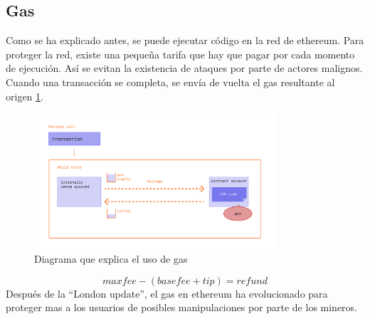 \subsection*{Gas}
Como se ha explicado antes, se puede ejecutar código en la red de ethereum. Para proteger la red, existe una pequeña tarifa que hay que pagar por cada momento de ejecución. Así se evitan la existencia de ataques por parte de actores malignos.
Cuando una transacción se completa, se envía de vuelta el gas resultante al origen \ref{fg:message_diagram}.
\begin{figure}[h!]
    \centering
    \includegraphics[width=0.8\textwidth]{Figures/gas-tx.png}
    \caption{Diagrama que explica el uso de gas}
    \label{fg:message_diagram}
\end{figure}
\begin{equation}
    max fee - (base fee + tip) = refund
\end{equation}
Después de la “London update”, el gas en ethereum ha evolucionado para proteger mas a los usuarios de posibles manipulaciones por parte de los mineros.

